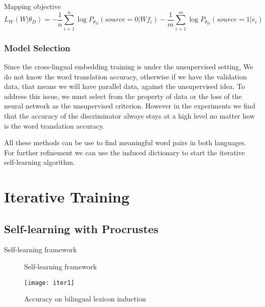 Mapping objective 
\[ L_W(W|\theta_D) =  -\frac{1}{n} \sum_{i=1}^{n}\log P_{\theta_D}(source=0|W f_i) - \frac{1}{m} \sum_{i=1}^{m} \log P_{\theta_D}(source = 1 | e_i) \]

\subsubsection{Model Selection}
Since the cross-lingual embedding training is under the unsupervised setting, We do not know the word translation accuracy, otherwise if we have the validation data, that means we will have parallel data, against the unsupervised idea. To address this issue, we must select from the property of data or the loss of the neural network as the unsupervised criterion. However in the experiments we find that the accuracy of the discriminator always stays at a high level no matter how is the word translation accuracy. 

All these methods can be use to find meaningful word pairs in both languages. For further refinement we can use the induced dictionary to start the iterative self-learning algorithm. 
\section{Iterative Training}
\subsection{Self-learning with Procrustes}
Self-learning framework\\

\begin{figure}[ht]
	\centering
	\begin{minipage}{.7\linewidth}
		\begin{algorithm}[H]
			\SetAlgoLined
			
			\caption{Self-learning framework}
		\end{algorithm}
	\end{minipage}
\end{figure}


\begin{figure}[t]
	\texttt{[image: iter1]}
	\centering
	\caption{Accuracy on bilingual lexicon induction}
\end{figure}
